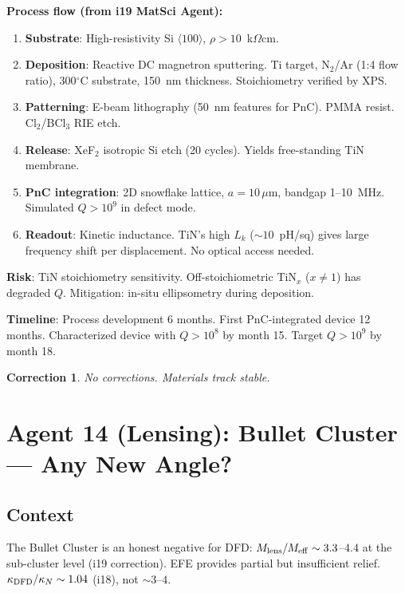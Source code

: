 \documentclass[11pt]{article}
\newtheorem{correction}[theorem]{Correction}
\theoremstyle{remark}
\begin{document}
\begin{newbox}
\textbf{Process flow (from i19 MatSci Agent):}
\begin{enumerate}
\item \textbf{Substrate}: High-resistivity Si $\langle 100 \rangle$, $\rho > 10$~k$\Omega$cm.
\item \textbf{Deposition}: Reactive DC magnetron sputtering. Ti target, N$_2$/Ar (1:4
  flow ratio), 300$^{\circ}$C substrate, 150~nm thickness. Stoichiometry verified by XPS.
\item \textbf{Patterning}: E-beam lithography (50~nm features for PnC). PMMA resist.
  Cl$_2$/BCl$_3$ RIE etch.
\item \textbf{Release}: XeF$_2$ isotropic Si etch (20 cycles). Yields free-standing
  TiN membrane.
\item \textbf{PnC integration}: 2D snowflake lattice, $a = 10\,\mu$m, bandgap
  1--10~MHz. Simulated $Q > 10^9$ in defect mode.
\item \textbf{Readout}: Kinetic inductance. TiN's high $L_k$ ($\sim 10$~pH/sq) gives
  large frequency shift per displacement. No optical access needed.
\end{enumerate}
\textbf{Risk}: TiN stoichiometry sensitivity. Off-stoichiometric TiN$_x$ ($x \neq 1$)
has degraded $Q$. Mitigation: in-situ ellipsometry during deposition.

\textbf{Timeline}: Process development 6 months. First PnC-integrated device 12 months.
Characterized device with $Q > 10^8$ by month 15. Target $Q > 10^9$ by month 18.
\end{newbox}

\begin{correction}
No corrections. Materials track stable.
\end{correction}

\newpage
\section{Agent 14 (Lensing): Bullet Cluster --- Any New Angle?}
\label{sec:agent14}

\subsection{Context}
The Bullet Cluster is an honest negative for DFD: $M_{\rm lens}/M_{\rm eff} \sim 3.3$--$4.4$
at the sub-cluster level (i19 correction). EFE provides partial but insufficient relief.
$\kappa_{\rm DFD}/\kappa_N \sim 1.04$ (i18), not $\sim 3$--$4$.
\end{document}
